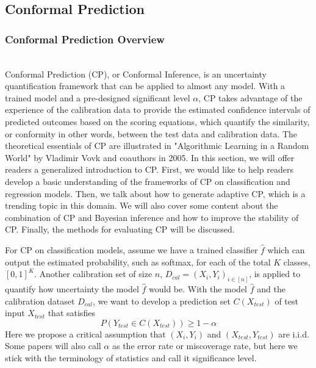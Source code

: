 \subsection{Conformal Prediction}
\subsubsection{Conformal Prediction Overview}\hfill\\
Conformal Prediction (CP), or Conformal Inference,  is an uncertainty quantification framework that can be applied to almost any model.  With a trained model and a pre-designed significant level $\alpha$, CP takes advantage of the experience of the calibration data to provide the estimated confidence intervals of predicted outcomes based on the scoring equations, which quantify the similarity, or conformity in other words, between the test data and calibration data. The theoretical essentials of CP are illustrated in "Algorithmic Learning in a Random World"\cite{vovk2005algorithmic} by Vladimir Vovk and coauthors in 2005. In this section, we will offer readers a generalized introduction to CP. First, we would like to help readers develop a basic understanding of the frameworks of CP on classification and regression models. Then, we talk about how to generate adaptive CP, which is a trending topic in this domain. We will also cover some content about the combination of CP and Bayesian inference and how to improve the stability of CP. Finally, the methods for evaluating CP will be discussed.

For CP on classification models, assume we have a trained classifier $\hat{f}$ which can output the estimated probability, such as softmax, for each of the total $K$ classes, $[0,1]^K$. Another calibration set of size $n$, $D_{cal}=(X_i,Y_i)_{i\in[n]}$, is applied to quantify how uncertainty the model $\hat{f}$ would be.  With the model $\hat{f}$ and the calibration dataset $D_{cal}$, we want to develop a prediction set $C(X_{test})$ of test input $X_{test}$ that satisfies
\begin{equation} 
P(Y_{test}\in C(X_{test})) \ge 1-\alpha\tag{4.2.1-1}
\end{equation}
Here we propose a critical assumption that $(X_i, Y_i)$ and $(X_{test}, Y_{test})$ are i.i.d. Some papers will also call $\alpha$ as the error rate or miscoverage rate, but here we stick with the terminology of statistics and call it significance level.

